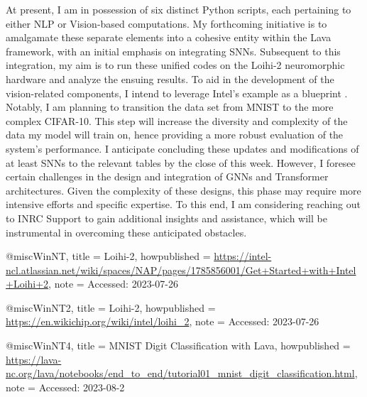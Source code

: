 At present, I am in possession of six distinct Python scripts, each pertaining to either NLP or Vision-based computations. My forthcoming initiative is to amalgamate these separate elements into a cohesive entity within the Lava framework, with an initial emphasis on integrating SNNs. Subsequent to this integration, my aim is to run these unified codes on the Loihi-2 neuromorphic hardware and analyze the ensuing results. To aid in the development of the vision-related components, I intend to leverage Intel's example as a blueprint \cite{WinNT4}. Notably, I am planning to transition the data set from MNIST to the more complex CIFAR-10. This step will increase the diversity and complexity of the data my model will train on, hence providing a more robust evaluation of the system's performance. I anticipate concluding these updates and modifications of at least SNNs to the relevant tables by the close of this week.
\vspace{5pt}
However, I foresee certain challenges in the design and integration of GNNs and Transformer architectures. Given the complexity of these designs, this phase may require more intensive efforts and specific expertise. To this end, I am considering reaching out to INRC Support to gain additional insights and assistance, which will be instrumental in overcoming these anticipated obstacles.



@misc{WinNT,
  title = {{Loihi-2}},
  howpublished = {\url{https://intel-ncl.atlassian.net/wiki/spaces/NAP/pages/1785856001/Get+Started+with+Intel+Loihi+2}},
  note = {Accessed: 2023-07-26}
}

@misc{WinNT2,
  title = {{Loihi-2}},
  howpublished = {\url{https://en.wikichip.org/wiki/intel/loihi_2}},
  note = {Accessed: 2023-07-26}
}


@misc{WinNT4,
  title = {{MNIST Digit Classification with Lava}},
  howpublished = {\url{https://lava-nc.org/lava/notebooks/end_to_end/tutorial01_mnist_digit_classification.html}},
  note = {Accessed: 2023-08-2}
}